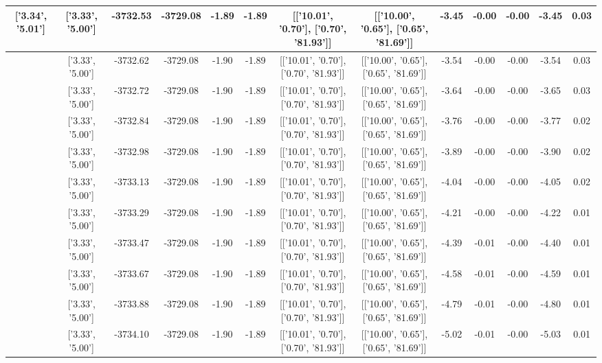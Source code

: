\begin{table}[htbp]
\begin{adjustbox}{angle=90}
\begin{tabular}{|c|c|c|c|c|c|c|c|c|c|c|c|c|}
 ['3.34', '5.01'] & ['3.33', '5.00'] & -3732.53 & -3729.08 & -1.89 & -1.89 & [['10.01', '0.70'], ['0.70', '81.93']] & [['10.00', '0.65'], ['0.65', '81.69']] & -3.45 & -0.00 & -0.00 & -3.45 & 0.03\\ \hline
 ['3.34', '5.01'] & ['3.33', '5.00'] & -3732.62 & -3729.08 & -1.90 & -1.89 & [['10.01', '0.70'], ['0.70', '81.93']] & [['10.00', '0.65'], ['0.65', '81.69']] & -3.54 & -0.00 & -0.00 & -3.54 & 0.03\\ \hline
 ['3.34', '5.01'] & ['3.33', '5.00'] & -3732.72 & -3729.08 & -1.90 & -1.89 & [['10.01', '0.70'], ['0.70', '81.93']] & [['10.00', '0.65'], ['0.65', '81.69']] & -3.64 & -0.00 & -0.00 & -3.65 & 0.03\\ \hline
 ['3.34', '5.01'] & ['3.33', '5.00'] & -3732.84 & -3729.08 & -1.90 & -1.89 & [['10.01', '0.70'], ['0.70', '81.93']] & [['10.00', '0.65'], ['0.65', '81.69']] & -3.76 & -0.00 & -0.00 & -3.77 & 0.02\\ \hline
 ['3.34', '5.01'] & ['3.33', '5.00'] & -3732.98 & -3729.08 & -1.90 & -1.89 & [['10.01', '0.70'], ['0.70', '81.93']] & [['10.00', '0.65'], ['0.65', '81.69']] & -3.89 & -0.00 & -0.00 & -3.90 & 0.02\\ \hline
 ['3.34', '5.01'] & ['3.33', '5.00'] & -3733.13 & -3729.08 & -1.90 & -1.89 & [['10.01', '0.70'], ['0.70', '81.93']] & [['10.00', '0.65'], ['0.65', '81.69']] & -4.04 & -0.00 & -0.00 & -4.05 & 0.02\\ \hline
 ['3.34', '5.01'] & ['3.33', '5.00'] & -3733.29 & -3729.08 & -1.90 & -1.89 & [['10.01', '0.70'], ['0.70', '81.93']] & [['10.00', '0.65'], ['0.65', '81.69']] & -4.21 & -0.00 & -0.00 & -4.22 & 0.01\\ \hline
 ['3.35', '5.01'] & ['3.33', '5.00'] & -3733.47 & -3729.08 & -1.90 & -1.89 & [['10.01', '0.70'], ['0.70', '81.93']] & [['10.00', '0.65'], ['0.65', '81.69']] & -4.39 & -0.01 & -0.00 & -4.40 & 0.01\\ \hline
 ['3.35', '5.01'] & ['3.33', '5.00'] & -3733.67 & -3729.08 & -1.90 & -1.89 & [['10.01', '0.70'], ['0.70', '81.93']] & [['10.00', '0.65'], ['0.65', '81.69']] & -4.58 & -0.01 & -0.00 & -4.59 & 0.01\\ \hline
 ['3.35', '5.01'] & ['3.33', '5.00'] & -3733.88 & -3729.08 & -1.90 & -1.89 & [['10.01', '0.70'], ['0.70', '81.93']] & [['10.00', '0.65'], ['0.65', '81.69']] & -4.79 & -0.01 & -0.00 & -4.80 & 0.01\\ \hline
 ['3.35', '5.02'] & ['3.33', '5.00'] & -3734.10 & -3729.08 & -1.90 & -1.89 & [['10.01', '0.70'], ['0.70', '81.93']] & [['10.00', '0.65'], ['0.65', '81.69']] & -5.02 & -0.01 & -0.00 & -5.03 & 0.01\\ \hline

\end{tabular}
\end{adjustbox}
\end{table}
